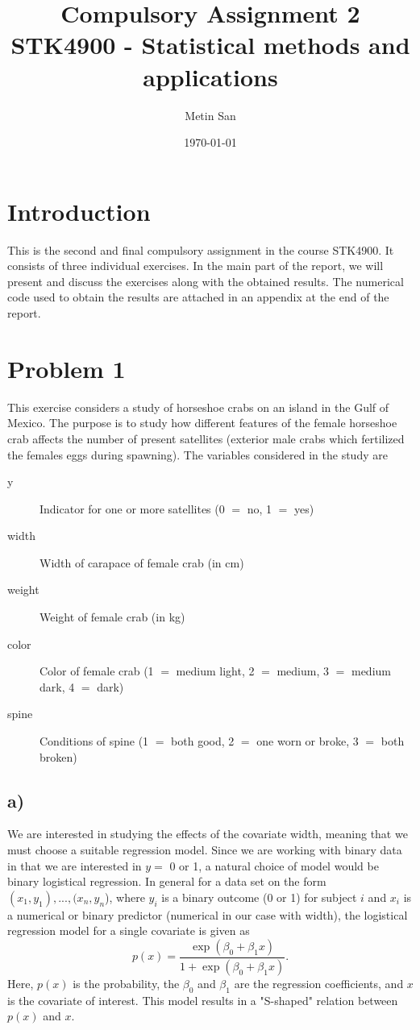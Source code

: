 \documentclass[a4paper, 10pt, reqno]{amsart}
\title[Compulsory Assignment 2]{\Large{Compulsory Assignment 2}\\
\normalsize{STK4900 - Statistical methods and applications}}
\author[Metin San]{Metin San}
\date{\today}
\begin{document}
\maketitle

\section{Introduction}
This is the second and final compulsory assignment in the course STK4900. It consists of three individual exercises. In the main part of the report, we will present and discuss the exercises along with the obtained results. The numerical code used to obtain the results  are attached in an appendix at the end of the report.


\section{Problem 1}
This exercise considers a study of horseshoe crabs on an island in the Gulf of Mexico. The purpose is to study how different features of the female horseshoe crab affects the number of present satellites (exterior male crabs which fertilized the females eggs during spawning). The variables considered in the study are
\begin{description}
    \item[y] Indicator for one or more satellites (0 $=$ no, 1 $=$ yes)
    \item[width] Width of carapace of female crab (in cm)
    \item[weight] Weight of female crab (in kg)
    \item[color] Color of female crab (1 $=$ medium light, 2 $=$ medium, 3 $=$ medium dark, 4 $=$ dark)
    \item[spine] Conditions of spine (1 $=$ both good, 2 $=$ one worn or broke, 3 $=$ both broken)
\end{description}

\subsection{a)}
We are interested in studying the effects of the covariate width, meaning that we must choose a suitable regression model.
Since we are working with binary data in that we are interested in $y =$ 0 or 1, a natural choice of model would be binary logistical regression. In general for a data set on the form $(x_1 , y_1), ... , (x_n, y_n$), where $y_i$ is a binary outcome (0 or 1) for subject $i$ and $x_i$ is a numerical or binary predictor (numerical in our case with width), the logistical regression model for a single covariate is given as
\begin{equation}
    p(x) = \frac{\exp(\beta_0 + \beta_1 x)}{1 + \exp(\beta_0 + \beta_1 x)}.
\end{equation}
Here, $p(x)$ is the probability, the $\beta_0$ and $\beta_1$ are the regression coefficients, and $x$ is the covariate of interest. This model results in a "S-shaped" relation between $p(x)$ and $x$.
\end{document}
